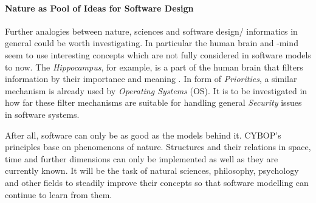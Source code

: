 %
%
%
%
%
%
%

\paragraph{Nature as Pool of Ideas for Software Design}
\label{nature_as_pool_heading}

Further analogies between nature, sciences and software design/ informatics in
general could be worth investigating. In particular the human brain and -mind
seem to use interesting concepts which are not fully considered in software
models to now. The \emph{Hippocampus}, for example, is a part of the human
brain that filters information by their importance and meaning
\cite{schoenhofer}. In form of \emph{Priorities}, a similar mechanism is
already used by \emph{Operating Systems} (OS). It is to be investigated in how
far these filter mechanisms are suitable for handling general \emph{Security}
issues in software systems.

After all, software can only be as good as the models behind it. CYBOP's
principles base on phenomenons of nature. Structures and their relations in
space, time and further dimensions can only be implemented as well as they are
currently known. It will be the task of natural sciences, philosophy, psychology
and other fields to steadily improve their concepts so that software modelling
can continue to learn from them.
